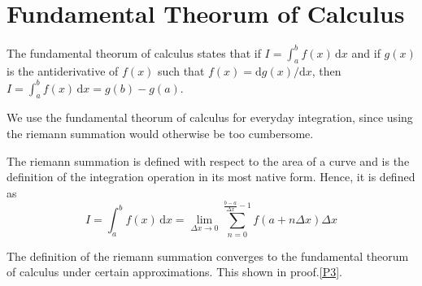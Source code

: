\chapter{Fundamental Theorum of Calculus}
\label{chap:2}
\begin{tcolorbox}
	The fundamental theorum of calculus states that if $I = \int_{a}^{b}f(x)\,\mathrm{d}x$ and if $g(x)$ is the antiderivative of $f(x)$ such that $f(x) = \mathrm{d}g(x)/\mathrm{d}x$, then $I = \int_{a}^{b}f(x)\,\mathrm{d}x = g(b)-g(a)$.
\end{tcolorbox}

We use the fundamental theorum of calculus for everyday integration, since using the riemann summation would otherwise be too cumbersome.\\

\begin{tcolorbox}
	The riemann summation is defined with respect to the area of a curve and is the definition of the integration operation in its most native form. Hence, it is defined as $$I = \int_{a}^{b}f(x)\,\mathrm{d}x = \lim_{\Delta x \to 0} \sum_{n=0}^{\frac{b-a}{\Delta x} - 1}f(a + n\Delta x)\Delta x$$
\end{tcolorbox}
The definition of the riemann summation converges to the fundamental theorum of calculus under certain approximations. This shown in proof.\ref{P3}.

